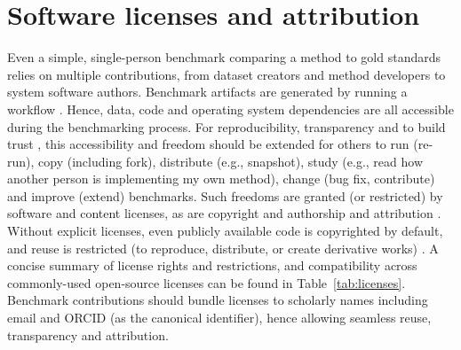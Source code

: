 \documentclass[11pt]{article}
\begin{document}
\section*{Software licenses and attribution}

Even a simple, single-person benchmark comparing a method to gold standards relies on multiple contributions, from dataset creators and method developers to system software authors. Benchmark artifacts are generated by running a workflow \cite{Jackson2021-ke}. Hence, data, code and operating system dependencies are all accessible during the benchmarking process. For reproducibility, transparency and to build trust \cite{Laine2007-py}, this accessibility and freedom should be extended for others to run (re-run), copy (including fork), distribute (e.g., snapshot), study (e.g., read how another person is implementing my own method), change (bug fix, contribute) and improve (extend) benchmarks. Such freedoms are granted (or restricted) by software and content licenses, as are copyright and authorship and attribution \cite{Kreutzer2014-ua}. Without explicit licenses, even publicly available code is copyrighted by default, and reuse is restricted (to reproduce, distribute, or create derivative works) \cite{Kreutzer2014-ua}. A concise summary of license rights and restrictions, and compatibility across commonly-used open-source licenses can be found in Table~\ref{tab:licenses}. Benchmark contributions should bundle licenses to scholarly names including email and ORCID (as the canonical identifier), hence allowing seamless reuse, transparency and attribution.
\end{document}
